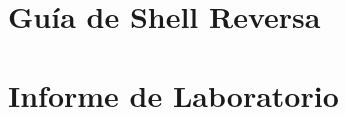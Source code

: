 \section{Guía de Shell Reversa}
\label{sec:guildelines}






\section{Informe de Laboratorio}





